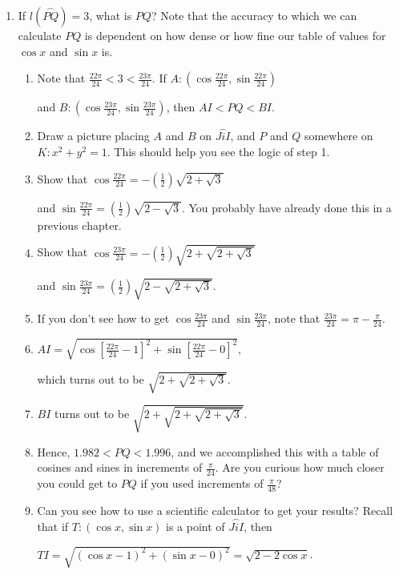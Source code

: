 \documentclass[english]{book}
\newcommand{\arc}[1]{\overset{\frown}{#1} }
\begin{document}
\begin{enumerate}
  \item[\hspace{1cm}d)] If $l(\arc{PQ})=3$, what is $PQ$? Note that the accuracy to which we can calculate $PQ$ is dependent on how dense or how fine our table of values for $\cos x$ and $\sin x$ is.
    \begin{enumerate}[\hspace{1cm}1)]
      \item Note that $\frac{22\pi}{24} < 3 < \frac{23\pi}{24}$. If $A:(\cos \frac{22\pi}{24}, \sin \frac{22\pi}{24})$ 

          and $B:(\cos \frac{23\pi}{24}, \sin \frac{23\pi}{24})$, then $AI < PQ < BI$.
      \item Draw a picture placing $A$ and $B$ on $\arc{JiI}$, and $P$ and $Q$ somewhere on $K:x^{2}+y^{2}=1$. This should help you see the logic of step 1.
      \item Show that $\cos \frac{22\pi}{24} = -(\frac{1}{2}) \sqrt{2+\sqrt{3}}$

          and $\sin \frac{22\pi}{24} = (\frac{1}{2}) \sqrt{2-\sqrt{3}}$. You probably have already done this in a previous chapter.
      \item Show that $\cos \frac{23\pi}{24} = -(\frac{1}{2}) \sqrt{2+\sqrt{2+\sqrt{3}}}$

          and $\sin \frac{23\pi}{24} = (\frac{1}{2}) \sqrt{2-\sqrt{2+\sqrt{3}}}$.
      \item If you don't see how to get $\cos \frac{23\pi}{24}$ and $\sin \frac{23\pi}{24}$, note that $\frac{23\pi}{24} = \pi - \frac{\pi}{24}$.
      \item $AI = \sqrt{\cos[\frac{22\pi}{24}-1]^{2} + \sin[\frac{22\pi}{24}-0]^{2}}$, 

          which turns out to be $\sqrt{2+\sqrt{2+\sqrt{3}}}$.
      \item $BI$ turns out to be $\sqrt{2+\sqrt{2+\sqrt{2+\sqrt{3}}}}$.
      \item Hence, $1.982 < PQ < 1.996$, and we accomplished this with a table of cosines and sines in increments of $\frac{\pi}{24}$. Are you curious how much closer you could get to $PQ$ if you used increments of $\frac{\pi}{48}$?
      \item Can you see how to use a scientific calculator to get your results? Recall that if $T:(\cos x,\sin x)$ is a point of $\arc{JiI}$, then

          $TI = \sqrt{(\cos x-1)^{2} + (\sin x-0)^{2}} = \sqrt{2-2 \cos x}$. 


\end{enumerate}
\end{enumerate}
\end{document}
